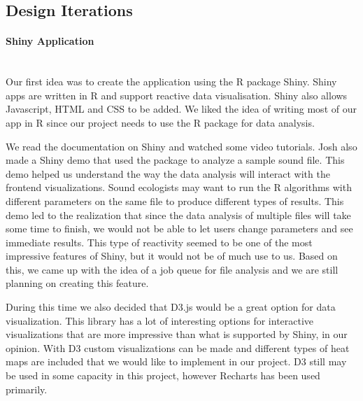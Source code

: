 \subsection{Design Iterations}

\paragraph{Shiny Application} \mbox{}\\[\paragraphheaderspace]
Our first idea was to create the application using the R package Shiny. Shiny apps are written in R and support reactive data visualisation. Shiny also allows Javascript, HTML and CSS to be added. We liked the idea of writing most of our app in R since our project needs to use the  R package for data analysis.\par
We read the documentation on Shiny and watched some video tutorials. Josh also made a Shiny demo that used the  package to analyze a sample sound file. This demo helped us understand the way the data analysis will interact with the frontend visualizations. Sound ecologists may want to run the R algorithms with different parameters on the same file to produce different types of results. This demo led to the realization that since the data analysis of multiple files will take some time to finish, we would not be able to let users change parameters and see immediate results. This type of reactivity seemed to be one of the most impressive features of Shiny, but it would not be of much use to us. Based on this, we came up with the idea of a job queue for file analysis and we are still planning on creating this feature.\par
During this time we also decided that D3.js would be a great option for data visualization. This library has a lot of interesting options for interactive visualizations that are more impressive than what is supported by Shiny, in our opinion. With D3 custom visualizations can be made and different types of heat maps are included that we would like to implement in our project. D3 still may be used in some capacity in this project, however Recharts has been used primarily.\par

